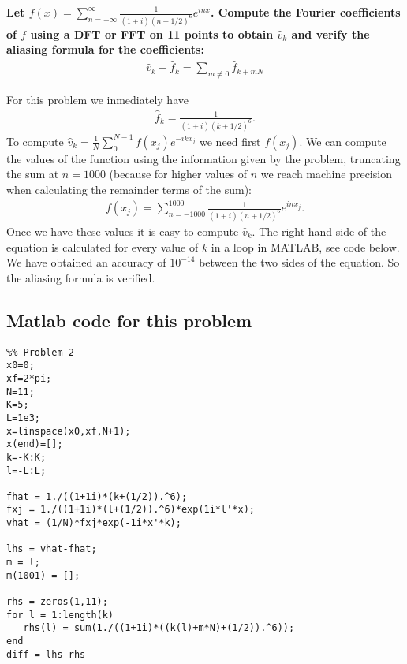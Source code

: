 \textbf{Let $f(x)=\sum_{n=-\infty}^{\infty}\frac{1}{(1+i)(n+1/2)^6}e^{inx}$. Compute the Fourier coefficients of $f$ using a DFT or FFT on 11 points to obtain $\hat{v}_k$ and verify the aliasing formula for the coefficients: 
\begin{align*}
\hat{v}_k-\hat{f}_k=\sum_{m\neq 0}\hat{f}_{k+mN}
\end{align*}}
\newline

For this problem we inmediately have
\begin{align*}
\hat{f}_k=\frac{1}{(1+i)(k+1/2)^6}.
\end{align*}
To compute $\hat{v}_k=\frac{1}{N}\sum_0^{N-1}f(x_j)e^{-ikx_j}$ we need first $f(x_j)$. We can compute the values of the function using the information given by the problem, truncating the sum at $n=1000$ (because for higher values of $n$ we reach machine precision when calculating the remainder terms of the sum):
\begin{align*}
f(x_j)=\sum_{n=-1000}^{1000}\frac{1}{(1+i)(n+1/2)^6}e^{inx_j}.
\end{align*}
Once we have these values it is easy to compute $\hat{v}_k$. The right hand side of the equation is calculated for every value of $k$ in a loop in MATLAB, see code below. We have obtained an accuracy of $10^{-14}$ between the two sides of the equation. So the aliasing formula is verified.

\subsection*{Matlab code for this problem}
\begin{verbatim}
%% Problem 2 
x0=0;
xf=2*pi;
N=11;
K=5;
L=1e3;
x=linspace(x0,xf,N+1);
x(end)=[];
k=-K:K;
l=-L:L;

fhat = 1./((1+1i)*(k+(1/2)).^6);
fxj = 1./((1+1i)*(l+(1/2)).^6)*exp(1i*l'*x);
vhat = (1/N)*fxj*exp(-1i*x'*k);

lhs = vhat-fhat;
m = l;
m(1001) = [];

rhs = zeros(1,11);
for l = 1:length(k)
   rhs(l) = sum(1./((1+1i)*((k(l)+m*N)+(1/2)).^6));
end
diff = lhs-rhs
\end{verbatim}